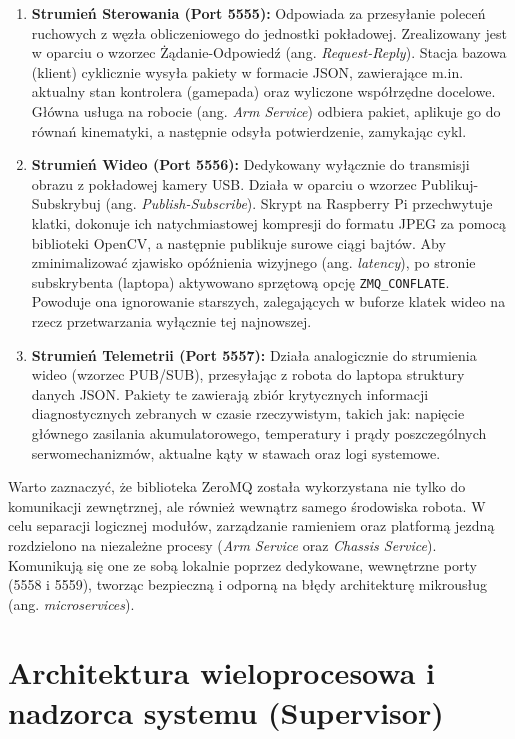 \documentclass[11pt]{extreport}
\begin{document}
\begin{enumerate}
    \item \textbf{Strumień Sterowania (Port 5555):} 
    Odpowiada za przesyłanie poleceń ruchowych z węzła obliczeniowego do jednostki pokładowej. Zrealizowany jest w oparciu o wzorzec Żądanie-Odpowiedź (ang. \textit{Request-Reply}). Stacja bazowa (klient) cyklicznie wysyła pakiety w formacie JSON, zawierające m.in. aktualny stan kontrolera (gamepada) oraz wyliczone współrzędne docelowe. Główna usługa na robocie (ang. \textit{Arm Service}) odbiera pakiet, aplikuje go do równań kinematyki, a następnie odsyła potwierdzenie, zamykając cykl.

    \item \textbf{Strumień Wideo (Port 5556):}
    Dedykowany wyłącznie do transmisji obrazu z pokładowej kamery USB. Działa w oparciu o wzorzec Publikuj-Subskrybuj (ang. \textit{Publish-Subscribe}). Skrypt na Raspberry Pi przechwytuje klatki, dokonuje ich natychmiastowej kompresji do formatu JPEG za pomocą biblioteki OpenCV, a następnie publikuje surowe ciągi bajtów. Aby zminimalizować zjawisko opóźnienia wizyjnego (ang. \textit{latency}), po stronie subskrybenta (laptopa) aktywowano sprzętową opcję \texttt{ZMQ\_CONFLATE}. Powoduje ona ignorowanie starszych, zalegających w buforze klatek wideo na rzecz przetwarzania wyłącznie tej najnowszej.
    
    \item \textbf{Strumień Telemetrii (Port 5557):}
    Działa analogicznie do strumienia wideo (wzorzec PUB/SUB), przesyłając z robota do laptopa struktury danych JSON. Pakiety te zawierają zbiór krytycznych informacji diagnostycznych zebranych w czasie rzeczywistym, takich jak: napięcie głównego zasilania akumulatorowego, temperatury i prądy poszczególnych serwomechanizmów, aktualne kąty w stawach oraz logi systemowe.
\end{enumerate}

Warto zaznaczyć, że biblioteka ZeroMQ została wykorzystana nie tylko do komunikacji zewnętrznej, ale również wewnątrz samego środowiska robota. W celu separacji logicznej modułów, zarządzanie ramieniem oraz platformą jezdną rozdzielono na niezależne procesy (\textit{Arm Service} oraz \textit{Chassis Service}). Komunikują się one ze sobą lokalnie poprzez dedykowane, wewnętrzne porty (5558 i 5559), tworząc bezpieczną i odporną na błędy architekturę mikrousług (ang. \textit{microservices}).

\section{Architektura wieloprocesowa i nadzorca systemu (Supervisor)}
\end{document}
